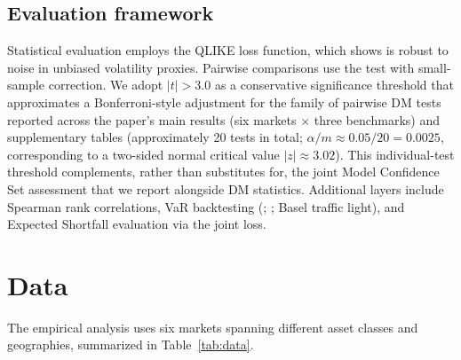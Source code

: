 \documentclass[11pt,a4paper]{article}
\begin{document}
\subsection{Evaluation framework}
\label{sec:eval_framework}

Statistical evaluation employs the QLIKE loss function, which \citet{Patton2011} shows is robust to noise in unbiased volatility proxies. Pairwise comparisons use the \citet{Diebold1995} test with \citet{Harvey1997} small-sample correction. We adopt $|t|>3.0$ as a conservative significance threshold that approximates a Bonferroni-style adjustment for the family of pairwise DM tests reported across the paper's main results (six markets $\times$ three benchmarks) and supplementary tables (approximately 20 tests in total; $\alpha/m \approx 0.05/20 = 0.0025$, corresponding to a two-sided normal critical value $|z|\approx 3.02$). This individual-test threshold complements, rather than substitutes for, the joint \citet{Hansen2011MCS} Model Confidence Set assessment that we report alongside DM statistics. Additional layers include Spearman rank correlations, VaR backtesting (\citealp{Kupiec1995}; \citealp{Christoffersen1998}; Basel traffic light), and Expected Shortfall evaluation via the \citet{Fissler2016} joint loss.


\section{Data}

The empirical analysis uses six markets spanning different asset classes and geographies, summarized in Table~\ref{tab:data}.
\end{document}
